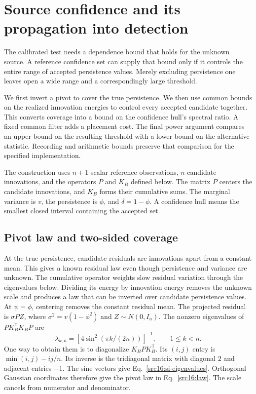 \section{Source confidence and its propagation into detection}\label{src16:proofs}
The calibrated test needs a dependence bound that holds for the unknown source. A reference confidence set can supply that bound only if it controls the entire range of accepted persistence values. Merely excluding persistence one leaves open a wide range and a correspondingly large threshold.

We first invert a pivot to cover the true persistence. We then use common bounds on the realized innovation energies to control every accepted candidate together. This converts coverage into a bound on the confidence hull's spectral ratio. A fixed common filter adds a placement cost. The final power argument compares an upper bound on the resulting threshold with a lower bound on the alternative statistic. Recording and arithmetic bounds preserve that comparison for the specified implementation.

The construction uses $n+1$ scalar reference observations, $n$ candidate innovations, and the operators $P$ and $K_B$ defined below. The matrix $P$ centers the candidate innovations, and $K_B$ forms their cumulative sums. The marginal variance is $v$, the persistence is $\phi$, and $\delta=1-\phi$. A confidence hull means the smallest closed interval containing the accepted set.


\subsection{Pivot law and two-sided coverage}\label{src16:si-pivot}
At the true persistence, candidate residuals are innovations apart from a constant mean. This gives a known residual law even though persistence and variance are unknown. The cumulative operator weights slow residual variation through the eigenvalues below. Dividing its energy by innovation energy removes the unknown scale and produces a law that can be inverted over candidate persistence values.
At $\psi=\phi$, centering removes the constant residual mean. The projected residual is $\sigma PZ$, where $\sigma^2=v(1-\phi^2)$ and $Z\sim N(0,I_n)$. The nonzero eigenvalues of $PK_B^{\mathsf T}K_BP$ are
\begin{equation}\label{src16:si-eigenvalues}
 \lambda_{k,n}=[4\sin^2(\pi k/(2n))]^{-1},\qquad 1\le k<n.
\end{equation}
One way to obtain them is to diagonalize $K_BPK_B^{\mathsf T}$. Its $(i,j)$ entry is $\min(i,j)-ij/n$. Its inverse is the tridiagonal matrix with diagonal $2$ and adjacent entries $-1$. The sine vectors give Eq.~\eqref{src16:si-eigenvalues}. Orthogonal Gaussian coordinates therefore give the pivot law in Eq.~\eqref{src16:law}. The scale cancels from numerator and denominator.

